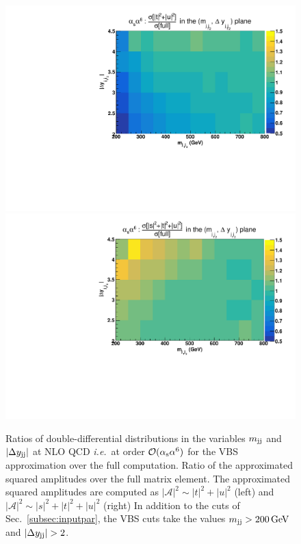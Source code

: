 \begin{figure}[hbt]
\centering
{\includegraphics[scale=0.395]{figures/scanfigures/a6as_vbfnloVSrecola_tu.pdf}}
{\includegraphics[scale=0.395]{figures/scanfigures/a6as_vbfnloVSrecola_stu.pdf}}
\caption{Ratios of double-differential distributions in the variables $m_{\text{j}\text{j}}$ and $|\Delta y_{\text{j}\text{j}}|$ at NLO QCD \emph{i.e.}\ at order $\mathcal{O}(\alpha_\text{s}\alpha^6)$ for the VBS approximation over the full computation.
Ratio of the approximated squared amplitudes over the full matrix element.
The approximated squared amplitudes are computed as $|\mathcal{A}|^2 \sim |t|^2+|u|^2$ (left) and $|\mathcal{A}|^2 \sim |s|^2+|t|^2+|u|^2$ (right)
In addition to the cuts of Sec.~\ref{subsec:inputpar}, the VBS cuts take the values $m_{\text{j}\text{j}}>200 \,\text{GeV}$ and $|\Delta y_{\Pj\Pj}|>2$.}
\label{fig:ratio2d_NLO}
\end{figure}
%

